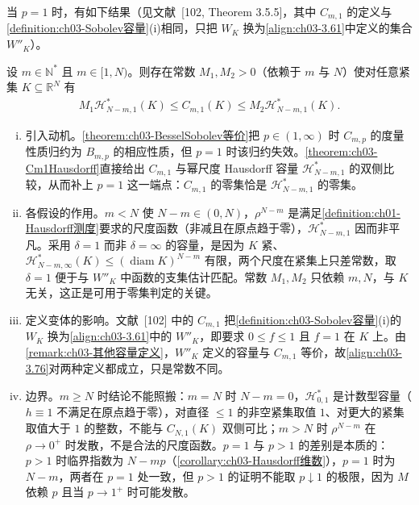 \documentclass[../../main.tex]{subfiles}%
\begin{document}
当 $p=1$ 时，有如下结果（见文献~[102, Theorem 3.5.5]，其中 $C_{m,1}$ 的定义与\cref{definition:ch03-Sobolev容量}(i)相同，只把 $W_K$ 换为\eqref{align:ch03-3.61}中定义的集合 $W''_K$）。

\begin{theorem}\label{theorem:ch03-Cm1Hausdorff}
设 $m\in\mathbb{N}^*$ 且 $m\in[1,N)$。则存在常数 $M_1,M_2>0$（依赖于 $m$ 与 $N$）使对任意紧集 $K\subseteq\mathbb{R}^N$ 有
\begin{align}
M_1\mathcal{H}^*_{N-m,1}(K)\leqslant C_{m,1}(K)\leqslant M_2\mathcal{H}^*_{N-m,1}(K).\label{align:ch03-3.76}
\end{align}
\end{theorem}

\begin{remark}\label{remark:ch03-Cm1Hausdorff动机}
\begin{enumerate}[(i)]
\item 引入动机。\cref{theorem:ch03-BesselSobolev等价}把 $p\in(1,\infty)$ 时 $C_{m,p}$ 的度量性质归约为 $B_{m,p}$ 的相应性质，但 $p=1$ 时该归约失效。\cref{theorem:ch03-Cm1Hausdorff}直接给出 $C_{m,1}$ 与幂尺度 Hausdorff 容量 $\mathcal{H}^*_{N-m,1}$ 的双侧比较，从而补上 $p=1$ 这一端点：$C_{m,1}$ 的零集恰是 $\mathcal{H}^*_{N-m,1}$ 的零集。
\item 各假设的作用。$m<N$ 使 $N-m\in(0,N)$，$\rho^{N-m}$ 是满足\cref{definition:ch01-Hausdorff测度}要求的尺度函数（非减且在原点趋于零），$\mathcal{H}^*_{N-m,1}$ 因而非平凡。采用 $\delta=1$ 而非 $\delta=\infty$ 的容量，是因为 $K$ 紧、$\mathcal{H}^*_{N-m,\infty}(K)\leqslant(\operatorname{diam}K)^{N-m}$ 有限，两个尺度在紧集上只差常数，取 $\delta=1$ 便于与 $W''_K$ 中函数的支集估计匹配。常数 $M_1,M_2$ 只依赖 $m,N$，与 $K$ 无关，这正是可用于零集判定的关键。
\item 定义变体的影响。文献~[102] 中的 $C_{m,1}$ 把\cref{definition:ch03-Sobolev容量}(i)的 $W_K$ 换为\eqref{align:ch03-3.61}中的 $W''_K$，即要求 $0\leqslant f\leqslant1$ 且 $f=1$ 在 $K$ 上。由\cref{remark:ch03-其他容量定义}，$W''_K$ 定义的容量与 $C_{m,1}$ 等价，故\eqref{align:ch03-3.76}对两种定义都成立，只是常数不同。
\item 边界。$m\geqslant N$ 时结论不能照搬：$m=N$ 时 $N-m=0$，$\mathcal{H}^*_{0,1}$ 是计数型容量（$h\equiv1$ 不满足在原点趋于零），对直径 $\leqslant1$ 的非空紧集取值 $1$、对更大的紧集取值大于 $1$ 的整数，不能与 $C_{N,1}(K)$ 双侧可比；$m>N$ 时 $\rho^{N-m}$ 在 $\rho\to0^+$ 时发散，不是合法的尺度函数。$p=1$ 与 $p>1$ 的差别是本质的：$p>1$ 时临界指数为 $N-mp$（\cref{corollary:ch03-Hausdorff维数}），$p=1$ 时为 $N-m$，两者在 $p=1$ 处一致，但 $p>1$ 的证明不能取 $p\downarrow1$ 的极限，因为 $M$ 依赖 $p$ 且当 $p\to1^+$ 时可能发散。
\end{enumerate}
\end{remark}
\end{document}
